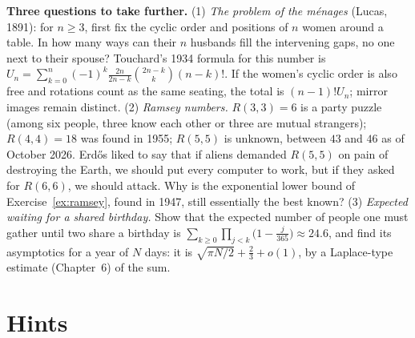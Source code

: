 \begin{challenge}
\textbf{Three questions to take further.} (1) \emph{The problem of the m\'enages} (Lucas, 1891): for $n\ge3$, first fix the cyclic order and positions of $n$ women around a table. In how many ways can their $n$ husbands fill the intervening gaps, no one next to their spouse? Touchard's 1934 formula for this number is $U_n=\sum_{k=0}^n(-1)^k\frac{2n}{2n-k}\binom{2n-k}k(n-k)!$. If the women's cyclic order is also free and rotations count as the same seating, the total is $(n-1)!U_n$; mirror images remain distinct. (2) \emph{Ramsey numbers.} $R(3,3)=6$ is a party puzzle (among six people, three know each other or three are mutual strangers); $R(4,4)=18$ was found in 1955; $R(5,5)$ is unknown, between $43$ and $46$ as of October 2026. Erd\H os liked to say that if aliens demanded $R(5,5)$ on pain of destroying the Earth, we should put every computer to work, but if they asked for $R(6,6)$, we should attack. Why is the exponential lower bound of Exercise~\ref{ex:ramsey}, found in 1947, still essentially the best known? (3) \emph{Expected waiting for a shared birthday.} Show that the expected number of people one must gather until two share a birthday is $\sum_{k\ge0}\prod_{j<k}\big(1-\frac j{365}\big)\approx24.6$, and find its asymptotics for a year of $N$ days: it is $\sqrt{\pi N/2}+\frac23+o(1)$, by a Laplace-type estimate (Chapter~6) of the sum.
\end{challenge}

\section{Hints}

